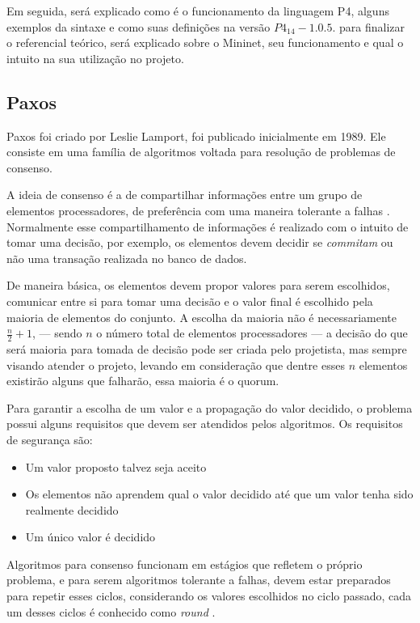 \documentclass[
    12pt,
    openright, 
    oneside,
    a4paper,
    french,
    english,
    brazil
    ]{facom-ufu-abntex2}
\theoremstyle{definition}
\begin{document}
Em seguida, será explicado como é o funcionamento da linguagem P4, alguns exemplos
da sintaxe e como suas definições na versão $P4_{14} - 1.0.5$. para finalizar o 
referencial teórico, será  explicado sobre o Mininet, seu funcionamento e qual o 
intuito na sua utilização no projeto.

\subsection{Paxos}
Paxos foi criado por Leslie Lamport, foi publicado inicialmente em 1989. Ele consiste em uma 
família de algoritmos voltada para resolução de problemas de consenso. 

A ideia de consenso é a de compartilhar informações entre um grupo de elementos
processadores, de preferência com uma maneira tolerante a falhas \cite{barborak1993consensus}.
Normalmente esse compartilhamento de informações é realizado com o intuito de tomar
uma decisão, por exemplo, os elementos devem decidir se \textit{commitam} ou não
uma transação realizada no banco de dados. 

De maneira básica, os elementos devem propor valores para serem escolhidos, 
comunicar entre si para tomar uma decisão e o valor final é escolhido pela maioria de 
elementos do conjunto.
A escolha da maioria não é necessariamente $\frac{n}{2}+1$, --- sendo $n$ o número
total de elementos processadores --- a decisão do que será maioria para tomada de decisão
pode ser criada pelo projetista, mas sempre visando atender o projeto, levando
em consideração que dentre esses $n$ elementos existirão alguns que falharão, essa maioria
é o quorum.

Para garantir a escolha de um valor e a propagação do valor decidido, o problema
possui alguns requisitos que devem ser atendidos pelos algoritmos. Os requisitos de
segurança são:

\begin{itemize}
    \item Um valor proposto talvez seja aceito
    \item Os elementos não aprendem qual o valor decidido até que um valor 
    tenha sido realmente decidido
    \item Um único valor é decidido
\end{itemize}

Algoritmos para consenso funcionam em estágios que refletem o próprio problema, e para
serem algoritmos tolerante a falhas, devem estar preparados para repetir esses ciclos,
considerando os valores escolhidos no ciclo passado, cada um desses ciclos é conhecido como
\textit{round} \cite{camargos2008multicoordinated}.
\end{document}
